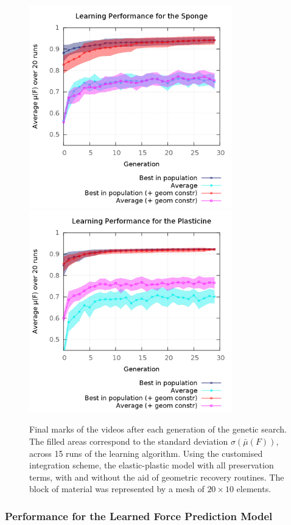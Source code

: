 \documentclass[journal]{IEEEtran}
\newcounter{algorithm}
\begin{document}
\begin{figure}[!t]
\centering
\includegraphics[width=88mm]{arrio6}
\includegraphics[width=88mm]{arrio7}
\caption{Final marks of the videos after each generation of the genetic search.  The filled areas correspond to the standard deviation $\sigma(\bar{\mu}(F))$, across 15 runs of the learning algorithm.  Using the customised integration scheme, the elastic-plastic model with all preservation terms, with and without the aid of geometric recovery routines.  The block of material was represented by a mesh of $20 \times 10$ elements.}\label{fig:performance}
\end{figure}

\subsubsection{Performance for the Learned Force Prediction Model}
\end{document}
